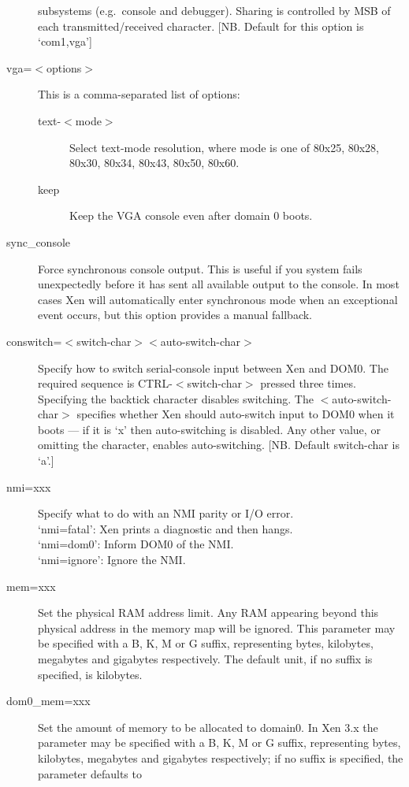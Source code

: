 \documentclass[11pt,twoside,final,openright]{report}
\begin{document}
\begin{description}
  subsystems (e.g.\ console and debugger). Sharing is controlled by
  MSB of each transmitted/received character.  [NB. Default for this
  option is `com1,vga']
\item [ vga=$<$options$>$ ] This is a comma-separated list of options:
  \begin{description}
  \item[ text-$<$mode$>$ ] Select text-mode resolution, where mode is
  one of 80x25, 80x28, 80x30, 80x34, 80x43, 80x50, 80x60.
  \item[ keep ] Keep the VGA console even after domain 0 boots.
  \end{description}
\item [ sync\_console ] Force synchronous console output. This is
  useful if you system fails unexpectedly before it has sent all
  available output to the console. In most cases Xen will
  automatically enter synchronous mode when an exceptional event
  occurs, but this option provides a manual fallback.
\item [ conswitch=$<$switch-char$><$auto-switch-char$>$ ] Specify how
  to switch serial-console input between Xen and DOM0. The required
  sequence is CTRL-$<$switch-char$>$ pressed three times. Specifying
  the backtick character disables switching.  The
  $<$auto-switch-char$>$ specifies whether Xen should auto-switch
  input to DOM0 when it boots --- if it is `x' then auto-switching is
  disabled.  Any other value, or omitting the character, enables
  auto-switching.  [NB. Default switch-char is `a'.]
\item [ nmi=xxx ]
  Specify what to do with an NMI parity or I/O error. \\
  `nmi=fatal':  Xen prints a diagnostic and then hangs. \\
  `nmi=dom0':   Inform DOM0 of the NMI. \\
  `nmi=ignore': Ignore the NMI.
\item [ mem=xxx ] Set the physical RAM address limit. Any RAM
  appearing beyond this physical address in the memory map will be
  ignored. This parameter may be specified with a B, K, M or G suffix,
  representing bytes, kilobytes, megabytes and gigabytes respectively.
  The default unit, if no suffix is specified, is kilobytes.
\item [ dom0\_mem=xxx ] Set the amount of memory to be allocated to
  domain0. In Xen 3.x the parameter may be specified with a B, K, M or
  G suffix, representing bytes, kilobytes, megabytes and gigabytes
  respectively; if no suffix is specified, the parameter defaults to

\end{description}
\end{document}
